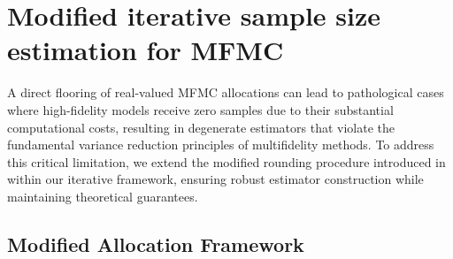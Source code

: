 \section{Modified iterative sample size estimation for MFMC}\label{sec:Modified_IntegerValued_Sample_Size}
A direct flooring of real-valued MFMC allocations can lead to pathological cases where high-fidelity models receive zero samples due to their substantial computational costs, resulting in degenerate estimators that violate the fundamental variance reduction principles of multifidelity methods. To address this critical limitation, we extend the modified rounding procedure introduced in~\cite{GrGuJuWa:2023} within our iterative framework, ensuring robust estimator construction while maintaining theoretical guarantees.

\subsection{Modified Allocation Framework}

